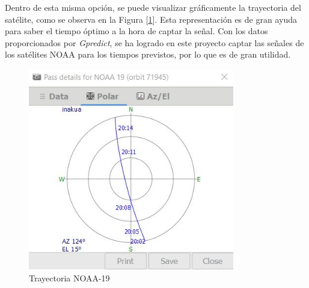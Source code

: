\documentclass[a4paper,openright,12pt]{article}
\begin{document}
   Dentro de esta misma opción, se puede visualizar gráficamente la trayectoria del satélite, como se observa en la Figura [\ref{trayectoria}]. Esta representación es de gran ayuda para saber el tiempo óptimo a la hora de captar la señal. Con los datos proporcionados por \textit{Gpredict}, se ha logrado en este proyecto captar las señales de los satélites NOAA para los tiempos previstos, por lo que es de gran utilidad.

	\begin{figure}[H]
 \centering
 \includegraphics[width = 9cm]{imagenes/future_passes.JPG}
 \caption{Trayectoria NOAA-19}
 \label{trayectoria}
 \end{figure}
 
\end{document}
